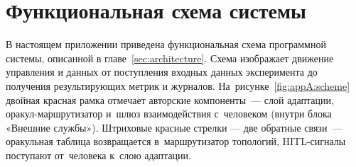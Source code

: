 
\clearpage
\section{Функциональная схема системы}
\label{app:uml}

\renewcommand{\thefigure}{\thesection.\arabic{figure}}
\setcounter{figure}{0}

В настоящем приложении приведена функциональная схема программной
системы, описанной в главе~\ref{sec:architecture}. Схема изображает
движение управления и данных от поступления входных данных
эксперимента до получения результирующих метрик и журналов.
На~рисунке~\ref{fig:appA:scheme} двойная красная рамка отмечает
авторские компоненты~--- слой адаптации, оракул-маршрутизатор и~шлюз
взаимодействия с~человеком (внутри блока «Внешние службы»). Штриховые
красные стрелки --- две обратные связи~--- оракульная таблица возвращается
в~маршрутизатор топологий, HITL-сигналы поступают от~человека
к~слою адаптации.

